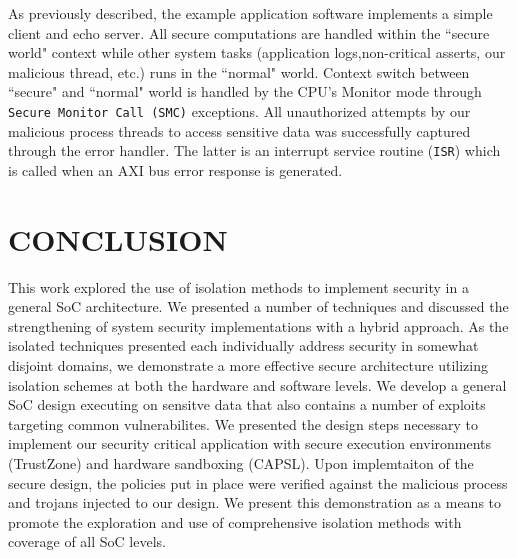 \documentclass[sigconf]{acmart}
\theoremstyle{plain}
\theoremstyle{remark}
\begin{document}
As previously described, the example application software implements a simple client and echo server. All secure computations are handled within the ``secure world" context while other system tasks (application logs,non-critical asserts, our malicious thread, etc.) runs in the ``normal" world.   Context switch between ``secure" and ``normal" world is handled by the CPU's Monitor mode through \texttt{Secure Monitor Call (SMC)} exceptions. All unauthorized attempts by our malicious process threads to access sensitive data was successfully captured through the error handler. The latter is an interrupt service routine (\texttt{ISR}) which is called when an AXI bus error response is generated.



\section{CONCLUSION} \label{sec:conclusion}
This work explored the use of isolation methods to implement security in a general SoC architecture. We presented a number of techniques and discussed the strengthening of system security implementations with a hybrid approach. As the isolated techniques presented each individually address security in somewhat disjoint domains, we demonstrate a more effective secure architecture utilizing isolation schemes at both the hardware and software levels. We develop a general SoC design executing on sensitve data that also contains a number of exploits targeting common vulnerabilites. We presented the design steps necessary to implement our security critical application with secure execution environments (TrustZone) and hardware sandboxing (CAPSL). Upon implemtaiton of the secure design, the policies put in place were verified against the malicious process and trojans injected to our design. We present this demonstration as a means to promote the exploration and use of comprehensive isolation methods with coverage of all SoC levels.



\end{document}
